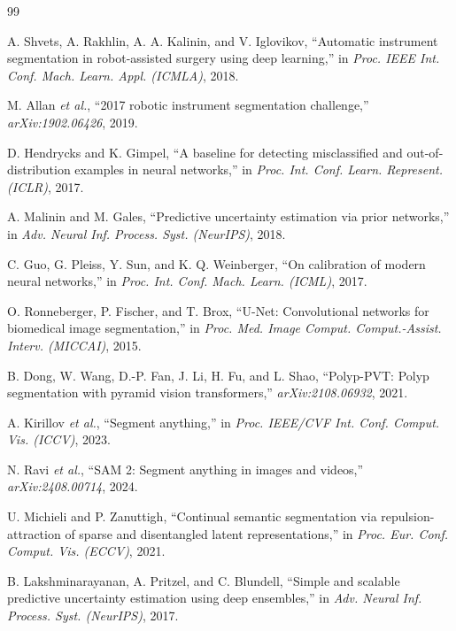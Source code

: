 \documentclass[letterpaper, 10 pt, conference]{ieeeconf}  %
\begin{document}
\begin{thebibliography}{99}

 A. Shvets, A. Rakhlin, A. A. Kalinin, and V. Iglovikov,
``Automatic instrument segmentation in robot-assisted surgery using deep
learning,'' in \emph{Proc. IEEE Int. Conf. Mach. Learn. Appl. (ICMLA)}, 2018.

 M. Allan \emph{et al.}, ``2017 robotic instrument
segmentation challenge,'' \emph{arXiv:1902.06426}, 2019.

 D. Hendrycks and K. Gimpel, ``A baseline for
detecting misclassified and out-of-distribution examples in neural
networks,'' in \emph{Proc. Int. Conf. Learn. Represent. (ICLR)}, 2017.

 A. Malinin and M. Gales, ``Predictive uncertainty
estimation via prior networks,'' in \emph{Adv. Neural Inf. Process. Syst.
(NeurIPS)}, 2018.

 C. Guo, G. Pleiss, Y. Sun, and K. Q. Weinberger, ``On
calibration of modern neural networks,'' in \emph{Proc. Int. Conf. Mach.
Learn. (ICML)}, 2017.

 O. Ronneberger, P. Fischer, and T. Brox, ``U-Net:
Convolutional networks for biomedical image segmentation,'' in \emph{Proc.
Med. Image Comput. Comput.-Assist. Interv. (MICCAI)}, 2015.

 B. Dong, W. Wang, D.-P. Fan, J. Li, H. Fu, and L. Shao,
``Polyp-PVT: Polyp segmentation with pyramid vision transformers,''
\emph{arXiv:2108.06932}, 2021.

 A. Kirillov \emph{et al.}, ``Segment anything,'' in
\emph{Proc. IEEE/CVF Int. Conf. Comput. Vis. (ICCV)}, 2023.

 N. Ravi \emph{et al.}, ``SAM 2: Segment anything in images
and videos,'' \emph{arXiv:2408.00714}, 2024.

 U. Michieli and P. Zanuttigh, ``Continual semantic
segmentation via repulsion-attraction of sparse and disentangled latent
representations,'' in \emph{Proc. Eur. Conf. Comput. Vis. (ECCV)}, 2021.

 B. Lakshminarayanan, A. Pritzel, and C. Blundell,
``Simple and scalable predictive uncertainty estimation using deep
ensembles,'' in \emph{Adv. Neural Inf. Process. Syst. (NeurIPS)}, 2017.


\end{thebibliography}
\end{document}
